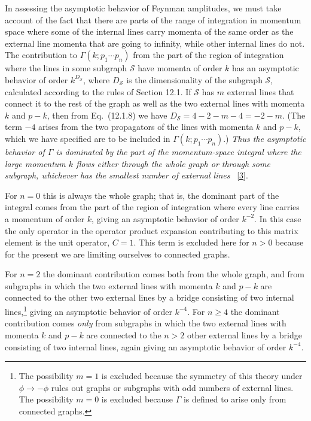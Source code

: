 In assessing the asymptotic behavior of Feynman amplitudes, we must take
account of the fact that there are parts of the range of integration in
momentum space where some of the internal lines carry momenta of the same
order as the external line momenta that are going to infinity, while other
internal lines do not. The contribution to $\Gamma(k;p_1\cdots p_n)$ from
the part of the region of integration where the lines in some subgraph
$\mathcal S$ have momenta of order $k$ has an asymptotic behavior of order
$k^{D_{\mathcal S}}$, where $D_{\mathcal S}$ is the dimensionality of the
subgraph $\mathcal S$, calculated according to the rules of Section 12.1. If
$\mathcal S$ has $m$ external lines that connect it to the rest of the graph
as well as the two external lines with momenta $k$ and $p-k$, then from
Eq.~(12.1.8) we have $D_{\mathcal S}=4-2-m-4=-2-m$. (The term $-4$
arises from the two propagators of the lines with momenta $k$ and $p-k$,
which we have specified are to be included in
$\Gamma(k;p_1\cdots p_n)$.) \emph{Thus the asymptotic behavior of $\Gamma$
is dominated by the part of the momentum-space integral where the large
momentum $k$ flows either through the whole graph or through some subgraph,
whichever has the smallest number of external lines}%
~\hyperref[ch20-ref-3]{[3]}.

For $n=0$ this is always the whole graph; that is, the dominant part of the
integral comes from the part of the region of integration where every line
carries a momentum of order $k$, giving an asymptotic behavior of order
$k^{-2}$. In this case the only operator in the operator product expansion
contributing to this matrix element is the unit operator, $C=1$. This term
is excluded here for $n>0$ because for the present we are limiting ourselves
to connected graphs.

For $n=2$ the dominant contribution comes both from the whole graph, and
from subgraphs in which the two external lines with momenta $k$ and $p-k$
are connected to the other two external lines by a bridge consisting of two
internal lines,\footnote{The possibility $m=1$ is excluded because the
symmetry of this theory under $\phi\to-\phi$ rules out graphs or subgraphs
with odd numbers of external lines. The possibility $m=0$ is excluded
because $\Gamma$ is defined to arise only from connected graphs.} giving an
asymptotic behavior of order $k^{-4}$. For $n\geq4$ the dominant contribution
comes \emph{only} from subgraphs in which the two external lines with momenta
$k$ and $p-k$ are connected to the $n>2$ other external lines by a bridge
consisting of two internal lines, again giving an asymptotic behavior of
order $k^{-4}$.


